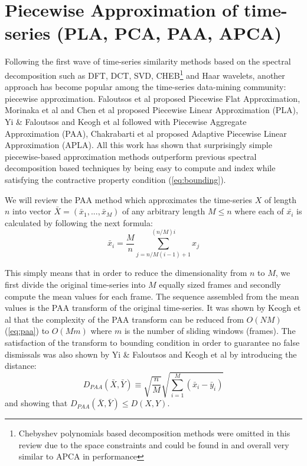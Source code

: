 \section{Piecewise Approximation of time-series (PLA, PCA, PAA, APCA)}
Following the first wave of time-series similarity methods based on the spectral decomposition such as DFT, DCT, SVD, CHEB\footnote{Chebyshev polynomials based decomposition methods were omitted in this review due to the space constraints and could be found in \cite{citeulike:2753031} and overall very similar to APCA in performance}
and Haar wavelets, another approach has become popular among the time-series data-mining community: piecewise approximation. Faloutsos et al \cite{citeulike:4344279} proposed Piecewise Flat Approximation, Morinaka et al \cite{citeulike:4295248} and Chen et al \cite{citeulike:4165220} proposed Piecewise Linear Approximation (PLA), Yi \& Faloutsos \cite{citeulike:2946589} and Keogh et al \cite{citeulike:3000416} followed with Piecewise Aggregate Approximation (PAA), Chakrabarti et al \cite{citeulike:1736140} proposed Adaptive Piecewise Linear Approximation (APLA). All this work has shown that surprisingly simple piecewise-based approximation methods outperform previous spectral decomposition based techniques by being easy to compute and index while satisfying the contractive property condition (\ref{eq:bounding}).

We will review the PAA method which approximates the time-series $X$ of length $n$ into vector $\bar{X} = ( \bar{x}_{1}, ..., \bar{x}_{M} )$ of any arbitrary length $M \leq n$ where each of $\bar{x_{i}}$ is calculated by following the next formula:
\begin{equation}
\bar{x}_{i} = \frac{M}{n} \sum_{j=n/M(i-1)+1}^{(n/M)i} x_{j}
\label{eq:paa}
\end{equation}

This simply means that in order to reduce the dimensionality from $n$ to $M$, we first divide the original time-series into $M$ equally sized frames and secondly compute the mean values for each frame. The sequence assembled from the mean values is the PAA transform of the original time-series. It was shown by Keogh et al that the complexity of the PAA transform can be reduced from $O(NM)$ (\ref{eq:paa}) to $O(Mm)$ where $m$ is the number of sliding windows (frames). The satisfaction of the transform to bounding condition in order to guarantee no false dismissals was also shown by Yi \& Faloutsos and Keogh et al by introducing the distance:
\begin{equation}
D_{PAA}(\bar{X}, \bar{Y}) \equiv \sqrt{\frac{n}{M}} \sqrt{ \sum_{i=1}^{M} 
\left(  \bar{x}_{i} - \bar{y}_{i} \right)}
\label{eq:paa_distnace}
\end{equation}
and showing that $D_{PAA}(\bar{X}, \bar{Y}) \leq D(X,Y)$.

